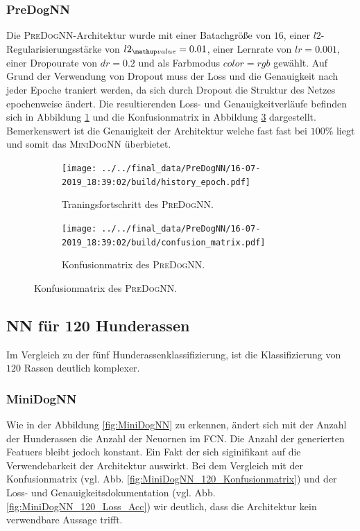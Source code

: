 \subsubsection{PreDogNN}
Die \textsc{PreDogNN}-Architektur wurde mit einer Batachgröße von $16$, einer
$l2$-Regularisierungsstärke von $l2\ua{value}=0.01$, einer Lernrate von
$lr=0.001$, einer Dropourate von $dr=0.2$ und als Farbmodus $color=rgb$ gewählt.
Auf Grund der Verwendung von Dropout muss der Loss und die Genauigkeit nach jeder
Epoche traniert werden, da sich durch Dropout die Struktur des Netzes epochenweise
ändert. Die resultierenden Loss- und Genauigkeitverläufe befinden sich in Abbildung
\ref{fig:PreDogNN_Loss_Acc} und die Konfusionmatrix in Abbildung \ref{fig:PreDogNN_Konfusionmatrix}
dargestellt. Bemerkenswert ist die Genauigkeit der Architektur welche fast
fast bei $100\%$ liegt und somit das \textsc{MiniDogNN} überbietet.

\begin{figure}
\centering
\begin{subfigure}{0.48\textwidth}
\centering
\texttt{[image: ../../final\_data/PreDogNN/16-07-2019\_18:39:02/build/history\_epoch.pdf]}
\caption{Traningsfortschritt des \textsc{PreDogNN}.}
\label{fig:PreDogNN_Loss_Acc}
\end{subfigure}
\begin{subfigure}{0.48\textwidth}
\centering
\texttt{[image: ../../final\_data/PreDogNN/16-07-2019\_18:39:02/build/confusion\_matrix.pdf]}
\caption{Konfusionmatrix des \textsc{PreDogNN}.}
\label{fig:PreDogNN_Konfusionmatrix}
\end{subfigure}
\end{figure}
\subsection{NN für 120 Hunderassen}
Im Vergleich zu der fünf Hunderassenklassifizierung, ist die Klassifizierung
von $120$ Rassen deutlich komplexer.
\subsubsection{MiniDogNN}
Wie in der Abbildung \ref{fig:MiniDogNN} zu erkennen, ändert sich mit der
Anzahl der Hunderassen die Anzahl der Neuornen im FCN. Die Anzahl der generierten
Featuers bleibt jedoch konstant. Ein Fakt der sich siginifikant auf die
Verwendebarkeit der Architektur auswirkt. Bei dem Vergleich mit der Konfusionmatrix
(vgl. Abb. \ref{fig:MiniDogNN_120_Konfusionmatrix}) und
der Loss- und Genauigkeitsdokumentation (vgl. Abb. \ref{fig:MiniDogNN_120_Loss_Acc})
wir deutlich, dass die Architektur kein verwendbare Aussage trifft.

